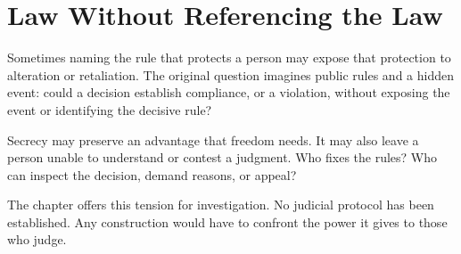 \chapter{Law Without Referencing the Law}
\label{short:law}

Sometimes naming the rule that protects a person may expose that protection
to alteration or retaliation. The original question imagines public rules
and a hidden event: could a decision establish compliance, or a violation,
without exposing the event or identifying the decisive rule?

Secrecy may preserve an advantage that freedom needs. It may also leave a
person unable to understand or contest a judgment. Who fixes the rules? Who
can inspect the decision, demand reasons, or appeal?

The chapter offers this tension for investigation. No judicial protocol has
been established. Any construction would have to confront the power it gives
to those who judge.

